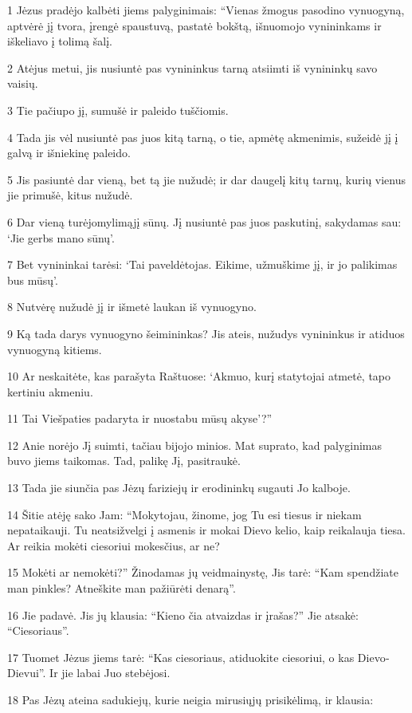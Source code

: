\par 1 Jėzus pradėjo kalbėti jiems palyginimais: “Vienas žmogus pasodino vynuogyną, aptvėrė jį tvora, įrengė spaustuvą, pastatė bokštą, išnuomojo vynininkams ir iškeliavo į tolimą šalį. 
\par 2 Atėjus metui, jis nusiuntė pas vynininkus tarną atsiimti iš vynininkų savo vaisių. 
\par 3 Tie pačiupo jį, sumušė ir paleido tuščiomis. 
\par 4 Tada jis vėl nusiuntė pas juos kitą tarną, o tie, apmėtę akmenimis, sužeidė jį į galvą ir išniekinę paleido. 
\par 5 Jis pasiuntė dar vieną, bet tą jie nužudė; ir dar daugelį kitų tarnų, kurių vienus jie primušė, kitus nužudė. 
\par 6 Dar vieną turėjo­mylimąjį sūnų. Jį nusiuntė pas juos paskutinį, sakydamas sau: ‘Jie gerbs mano sūnų’. 
\par 7 Bet vynininkai tarėsi: ‘Tai paveldėtojas. Eikime, užmuškime jį, ir jo palikimas bus mūsų’. 
\par 8 Nutvėrę nužudė jį ir išmetė laukan iš vynuogyno. 
\par 9 Ką tada darys vynuogyno šeimininkas? Jis ateis, nužudys vynininkus ir atiduos vynuogyną kitiems. 
\par 10 Ar neskaitėte, kas parašyta Raštuose: ‘Akmuo, kurį statytojai atmetė, tapo kertiniu akmeniu. 
\par 11 Tai Viešpaties padaryta ir nuostabu mūsų akyse’?” 
\par 12 Anie norėjo Jį suimti, tačiau bijojo minios. Mat suprato, kad palyginimas buvo jiems taikomas. Tad, palikę Jį, pasitraukė. 
\par 13 Tada jie siunčia pas Jėzų fariziejų ir erodininkų sugauti Jo kalboje. 
\par 14 Šitie atėję sako Jam: “Mokytojau, žinome, jog Tu esi tiesus ir niekam nepataikauji. Tu neatsižvelgi į asmenis ir mokai Dievo kelio, kaip reikalauja tiesa. Ar reikia mokėti ciesoriui mokesčius, ar ne? 
\par 15 Mokėti ar nemokėti?” Žinodamas jų veidmainystę, Jis tarė: “Kam spendžiate man pinkles? Atneškite man pažiūrėti denarą”. 
\par 16 Jie padavė. Jis jų klausia: “Kieno čia atvaizdas ir įrašas?” Jie atsakė: “Ciesoriaus”. 
\par 17 Tuomet Jėzus jiems tarė: “Kas ciesoriaus, atiduokite ciesoriui, o kas Dievo­Dievui”. Ir jie labai Juo stebėjosi. 
\par 18 Pas Jėzų ateina sadukiejų, kurie neigia mirusiųjų prisikėlimą, ir klausia: 
